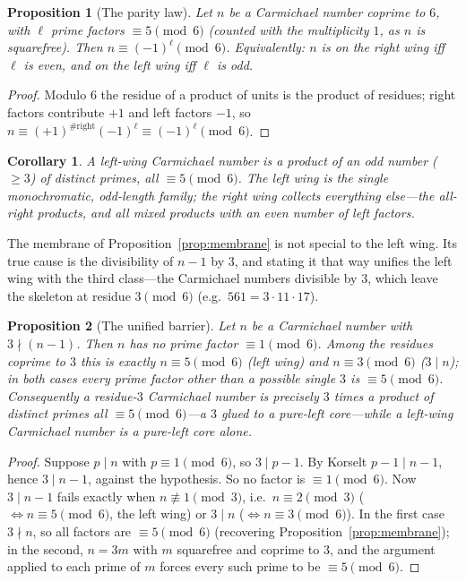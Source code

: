 \documentclass[11pt]{article}
\theoremstyle{plain}
\newtheorem{proposition}{Proposition}
\newtheorem{corollary}{Corollary}
\theoremstyle{definition}
\begin{document}
\begin{proposition}[The parity law]\label{prop:parity}
Let $n$ be a Carmichael number coprime to $6$, with $\ell$ prime factors $\equiv5\pmod6$ (counted with
the multiplicity $1$, as $n$ is squarefree). Then $n\equiv(-1)^{\ell}\pmod6$. Equivalently: $n$ is on
the right wing iff $\ell$ is even, and on the left wing iff $\ell$ is odd.
\end{proposition}

\begin{proof}
Modulo $6$ the residue of a product of units is the product of residues; right factors contribute $+1$
and left factors $-1$, so $n\equiv(+1)^{\#\text{right}}(-1)^{\ell}\equiv(-1)^{\ell}\pmod6$.
\end{proof}

\begin{corollary}\label{cor:left}
A left-wing Carmichael number is a product of an \emph{odd} number ($\ge3$) of distinct primes, all
$\equiv5\pmod6$. The left wing is the single monochromatic, odd-length family; the right wing
collects everything else---the all-right products, and all mixed products with an even number of left
factors.
\end{corollary}

The membrane of Proposition~\ref{prop:membrane} is not special to the left wing. Its true cause is the
divisibility of $n-1$ by $3$, and stating it that way unifies the left wing with the third class---the
Carmichael numbers divisible by $3$, which leave the skeleton at residue $3\pmod6$ (e.g.\
$561=3\cdot11\cdot17$).

\begin{proposition}[The unified barrier]\label{prop:barrier}
Let $n$ be a Carmichael number with $3\nmid(n-1)$. Then $n$ has no prime factor $\equiv1\pmod6$. Among
the residues coprime to $3$ this is exactly $n\equiv5\pmod6$ (left wing) and $n\equiv3\pmod6$
($3\mid n$); in both cases every prime factor other than a possible single $3$ is $\equiv5\pmod6$.
Consequently a residue-$3$ Carmichael number is precisely $3$ times a product of distinct primes all
$\equiv5\pmod6$---a $3$ glued to a pure-left core---while a left-wing Carmichael number is a pure-left
core alone.
\end{proposition}

\begin{proof}
Suppose $p\mid n$ with $p\equiv1\pmod6$, so $3\mid p-1$. By Korselt $p-1\mid n-1$, hence $3\mid n-1$,
against the hypothesis. So no factor is $\equiv1\pmod6$. Now $3\mid n-1$ fails exactly when
$n\not\equiv1\pmod3$, i.e.\ $n\equiv2\pmod3$ ($\Leftrightarrow n\equiv5\pmod6$, the left wing) or
$3\mid n$ ($\Leftrightarrow n\equiv3\pmod6$). In the first case $3\nmid n$, so all factors are
$\equiv5\pmod6$ (recovering Proposition~\ref{prop:membrane}); in the second, $n=3m$ with $m$ squarefree
and coprime to $3$, and the argument applied to each prime of $m$ forces every such prime to be
$\equiv5\pmod6$.
\end{proof}
\end{document}
